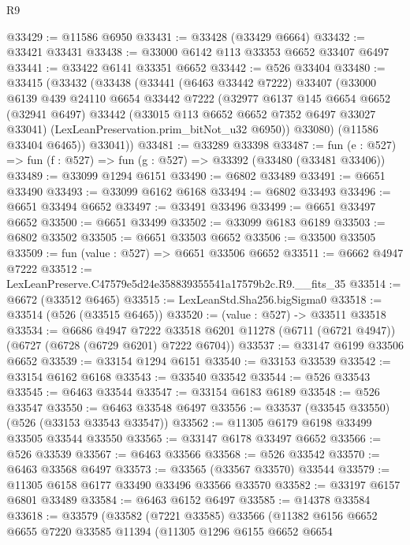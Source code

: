 \begin{lexlean}{R9}
\begin{coremodule}
@33429 := @11586 @6950
@33431 := @33428 (@33429 @6664)
@33432 := @33421 @33431
@33438 := @33000 @6142 @113 @33353 @6652 @33407 @6497
@33441 := @33422 @6141 @33351 @6652
@33442 := @526 @33404
@33480 := @33415
    (@33432
      (@33438
        (@33441
          (@6463 @33442 @7222)
          @33407
          (@33000
            @6139
            @439
            @24110
            @6654
            @33442
            @7222
            (@32977
              @6137
              @145
              @6654
              @6652
              (@32941 @6497)
              @33442
              (@33015 @113 @6652 @6652 @7352 @6497 @33027 @33041)
              (LexLeanPreservation.prim_bitNot_u32 @6950))
            @33080)
          (@11586 @33404 @6465))
        @33041))
@33481 := @33289 @33398
@33487 := fun (e : @527) => fun (f : @527) => fun (g : @527) => @33392 (@33480 (@33481 @33406))
@33489 := @33099 @1294 @6151
@33490 := @6802 @33489
@33491 := @6651 @33490
@33493 := @33099 @6162 @6168
@33494 := @6802 @33493
@33496 := @6651 @33494 @6652
@33497 := @33491 @33496
@33499 := @6651 @33497 @6652
@33500 := @6651 @33499
@33502 := @33099 @6183 @6189
@33503 := @6802 @33502
@33505 := @6651 @33503 @6652
@33506 := @33500 @33505
@33509 := fun (value : @527) => @6651 @33506 @6652
@33511 := @6662 @4947 @7222
@33512 := LexLeanPreserve.C47579e5d24e358839355541a17579b2c.R9.__fits_35
@33514 := @6672 (@33512 @6465)
@33515 := LexLeanStd.Sha256.bigSigma0
@33518 := @33514 (@526 (@33515 @6465))
@33520 := (value : @527) -> @33511 @33518
@33534 := @6686
    @4947
    @7222
    @33518
    @6201
    @11278
    (@6711 (@6721 @4947))
    (@6727 (@6728 (@6729 @6201) @7222 @6704))
@33537 := @33147 @6199 @33506 @6652
@33539 := @33154 @1294 @6151
@33540 := @33153 @33539
@33542 := @33154 @6162 @6168
@33543 := @33540 @33542
@33544 := @526 @33543
@33545 := @6463 @33544
@33547 := @33154 @6183 @6189
@33548 := @526 @33547
@33550 := @6463 @33548 @6497
@33556 := @33537 (@33545 @33550) (@526 (@33153 @33543 @33547))
@33562 := @11305 @6179 @6198 @33499 @33505 @33544 @33550
@33565 := @33147 @6178 @33497 @6652
@33566 := @526 @33539
@33567 := @6463 @33566
@33568 := @526 @33542
@33570 := @6463 @33568 @6497
@33573 := @33565 (@33567 @33570) @33544
@33579 := @11305 @6158 @6177 @33490 @33496 @33566 @33570
@33582 := @33197 @6157 @6801 @33489
@33584 := @6463 @6152 @6497
@33585 := @14378 @33584
@33618 := @33579
    (@33582
      (@7221 @33585)
      @33566
      (@11382
        @6156
        @6652
        @6655
        @7220
        @33585
        @11394
        (@11305
          @1296
          @6155
          @6652
          @6654

\end{coremodule}
\end{lexlean}

